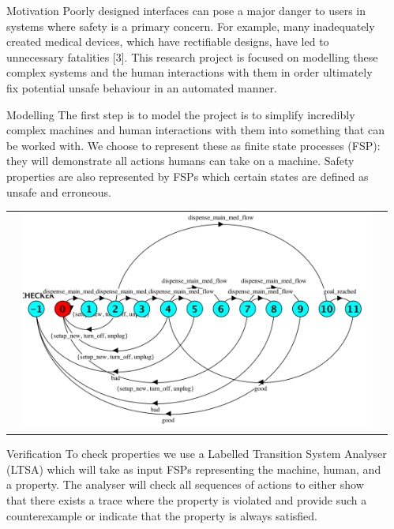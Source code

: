 \documentclass[final,20pt]{beamer}
\newlength{\sepwid}
\newlength{\onecolwid}
\begin{document}
\begin{frame}[t]
\begin{columns}[t]
\begin{column}{\sepwid}\end{column}
\begin{column}{\onecolwid}
\begin{block}{\Large Motivation}
\large Poorly designed interfaces can pose a major danger to users in systems where safety is a primary concern.  For example, many inadequately created medical devices, which have rectifiable designs, have led to unnecessary fatalities [3].  This research project is focused on modelling these complex systems and the human interactions with them in order ultimately fix potential unsafe behaviour in an automated manner.
\end{block}

\begin{block}{\Large Modelling}
\large The first step is to model the project is to simplify incredibly complex machines and human interactions with them into something that can be worked with.  We choose to represent these as finite state processes (FSP): they will demonstrate all actions humans can take on a machine.  Safety properties are also represented by FSPs which certain states are defined as unsafe and erroneous.

\begin{tabular}{ccc}
      \hfill   & \hspace{2cm}\includegraphics[width=0.8\linewidth]{fspexample.png} & \hfill
\end{tabular}
\vspace{-2cm}
\end{block}

\begin{block}{\Large Verification}
\large To check properties we use a Labelled Transition System Analyser (LTSA) which will take as input FSPs representing the machine, human, and a property.  The analyser will check all sequences of actions to either show that there exists a trace where the property is violated and provide such a counterexample or indicate that the property is always satisfied.
\end{block}


\end{column}
\end{columns}
\end{frame}
\end{document}
